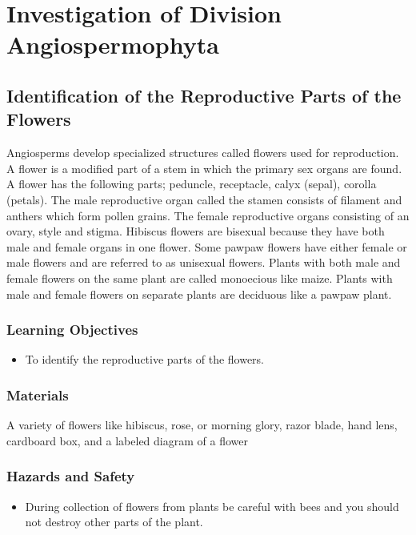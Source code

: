 \section{Investigation of Division Angiospermophyta}

\subsection{Identification of the Reproductive Parts of the Flowers}
Angiosperms develop specialized structures called flowers used for reproduction. A flower is a modified part of a stem in which the primary sex organs are found. A flower has the following parts; peduncle, receptacle, calyx (sepal), corolla (petals). The male reproductive organ called the stamen consists of filament and anthers which form pollen grains. The female reproductive organs consisting of an ovary, style and stigma. Hibiscus flowers are bisexual because they have both male and female organs in one flower. Some pawpaw flowers have either female or male flowers and are referred to as unisexual flowers. Plants with both male and female flowers on the same plant are called monoecious like maize. Plants with male and female flowers on separate plants are deciduous like a pawpaw plant.

\subsubsection*{Learning Objectives}
\begin{itemize}
\item{To identify the reproductive parts of the flowers.}
\end{itemize}

\subsubsection*{Materials}
A variety of flowers like hibiscus, rose, or morning glory, razor blade, hand lens, cardboard box, and a labeled diagram of a flower

\subsubsection*{Hazards and Safety}
\begin{itemize}
\item{During collection of flowers from plants be careful with bees and you should not destroy other parts of the plant.}
\end{itemize}

